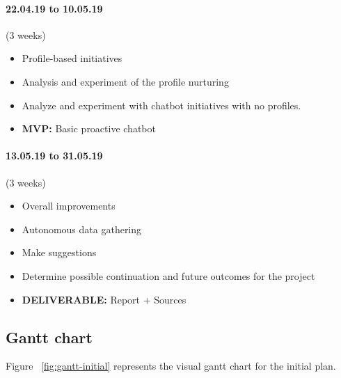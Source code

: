 \paragraph{22.04.19 to 10.05.19} (3 weeks)
\begin{itemize}
    \setlength\itemsep{0em}
    \item Profile-based initiatives
    \item Analysis and experiment of the profile nurturing 
    \item Analyze and experiment with chatbot initiatives with no profiles.
    \item \textbf{MVP:} Basic proactive chatbot
\end{itemize}

\paragraph{13.05.19 to 31.05.19} (3 weeks)
\begin{itemize}
    \setlength\itemsep{0em}
    \item Overall improvements
    \item Autonomous data gathering
    \item Make suggestions
    \item Determine possible continuation and future outcomes for the project
    \item \textbf{DELIVERABLE:} Report + Sources
\end{itemize}

\subsection{Gantt chart}
Figure ~\ref{fig:gantt-initial} represents the visual gantt chart for the initial plan.




